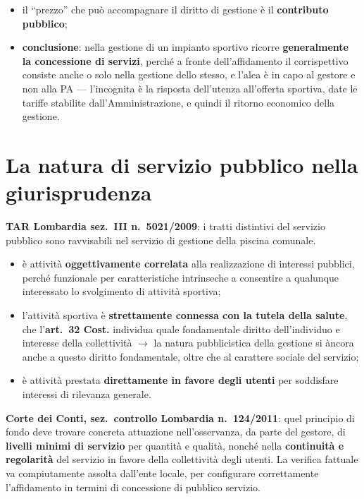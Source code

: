 \begin{itemize}
  \item il ``prezzo'' che può accompagnare il diritto di gestione è il \textbf{contributo
    pubblico};
  \item \textbf{conclusione}: nella gestione di un impianto sportivo ricorre \textbf{generalmente
    la concessione di servizi}, perché a fronte dell'affidamento il corrispettivo consiste anche o
    solo nella gestione dello stesso, e l'alea è in capo al gestore e non alla PA --- l'incognita
    è la risposta dell'utenza all'offerta sportiva, date le tariffe stabilite
    dall'Amministrazione, e quindi il ritorno economico della gestione.
\end{itemize}

\section{La natura di servizio pubblico nella giurisprudenza}

\textbf{TAR Lombardia sez.\ III n.\ 5021/2009}: i tratti distintivi del servizio pubblico sono
ravvisabili nel servizio di gestione della piscina comunale.

\begin{itemize}
  \item è attività \textbf{oggettivamente correlata} alla realizzazione di interessi pubblici,
    perché funzionale per caratteristiche intrinseche a consentire a qualunque interessato lo
    svolgimento di attività sportiva;
  \item l'attività sportiva è \textbf{strettamente connessa con la tutela della salute}, che
    l'\textbf{art.\ 32 Cost.} individua quale fondamentale diritto dell'individuo e interesse
    della collettività $\rightarrow$ la natura pubblicistica della gestione si àncora anche a
    questo diritto fondamentale, oltre che al carattere sociale del servizio;
  \item è attività prestata \textbf{direttamente in favore degli utenti} per soddisfare interessi
    di rilevanza generale.
\end{itemize}

\textbf{Corte dei Conti, sez.\ controllo Lombardia n.\ 124/2011}: quel principio di fondo deve
trovare concreta attuazione nell'osservanza, da parte del gestore, di \textbf{livelli minimi di
servizio} per quantità e qualità, nonché nella \textbf{continuità e regolarità} del servizio in
favore della collettività degli utenti. La verifica fattuale va compiutamente assolta dall'ente
locale, per configurare correttamente l'affidamento in termini di concessione di pubblico
servizio.

